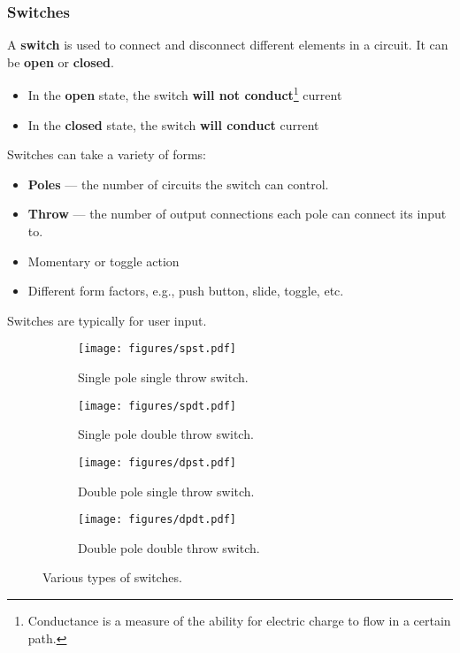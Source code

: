 \documentclass{article}
\begin{document}
\subsubsection{Switches}
A \textbf{switch} is used to connect and disconnect different elements
in a circuit. It can be \textbf{open} or \textbf{closed}.
\begin{itemize}
    \item In the \textbf{open} state, the switch \textbf{will not
          conduct}\footnote{Conductance is a measure of the ability for
          electric charge to flow in a certain path.} current
    \item In the \textbf{closed} state, the switch \textbf{will
          conduct} current
\end{itemize}
Switches can take a variety of forms:
\begin{itemize}
    \item \textbf{Poles} --- the number of circuits the switch can control.
    \item \textbf{Throw} --- the number of output connections each pole can connect its input to.
    \item Momentary or toggle action
    \item Different form factors, e.g., push button, slide, toggle,
          etc.
\end{itemize}
Switches are typically for user input.
\begin{figure}[H]
    \centering
    \begin{subfigure}{0.47\linewidth}
        \centering
        \texttt{[image: figures/spst.pdf]}
        \caption{Single pole single throw switch.}
    \end{subfigure}
    \begin{subfigure}{0.47\linewidth}
        \centering
        \texttt{[image: figures/spdt.pdf]}
        \caption{Single pole double throw switch.}
    \end{subfigure}

    \vspace*{5ex}
    \begin{subfigure}{0.47\linewidth}
        \centering
        \texttt{[image: figures/dpst.pdf]}
        \caption{Double pole single throw switch.}
    \end{subfigure}
    \begin{subfigure}{0.47\linewidth}
        \centering
        \texttt{[image: figures/dpdt.pdf]}
        \caption{Double pole double throw switch.}
    \end{subfigure}
    \caption{Various types of switches.}
\end{figure}
\end{document}
